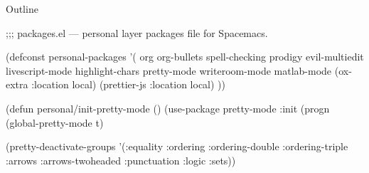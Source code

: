 \documentclass[presentation]{beamer}
\author{Vittorio Zaccaria}
\date{\today}
\title{}
\begin{document}
\begin{frame}{Outline}
\tableofcontents
\end{frame}

;;; packages.el --- personal layer packages file for Spacemacs.


(defconst personal-packages
  '(
    org
    org-bullets
    spell-checking
    prodigy
    evil-multiedit
    livescript-mode
    highlight-chars
    pretty-mode
    writeroom-mode
    matlab-mode
    (ox-extra :location local)
    (prettier-js :location local)
    ))


(defun personal/init-pretty-mode ()
  (use-package pretty-mode
    :init
    (progn (global-pretty-mode t)

(pretty-deactivate-groups
 '(:equality :ordering :ordering-double :ordering-triple
             :arrows :arrows-twoheaded :punctuation
             :logic :sets))
\end{document}
